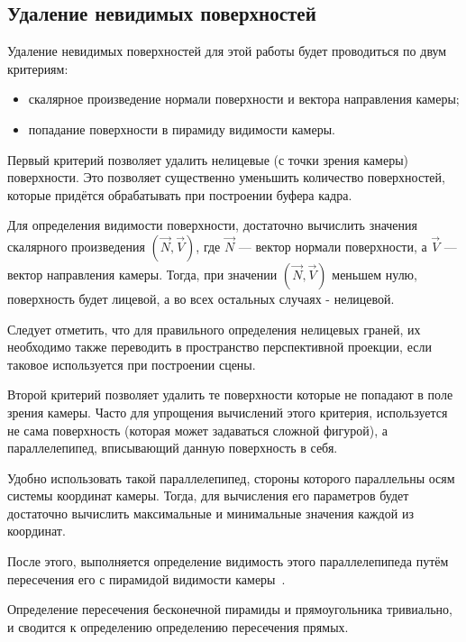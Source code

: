 \subsection{Удаление невидимых поверхностей}

Удаление невидимых поверхностей для этой работы будет проводиться по двум критериям:

\begin{itemize}
    \item скалярное произведение нормали поверхности и вектора направления камеры;
    \item попадание поверхности в пирамиду видимости камеры.
\end{itemize}

Первый критерий позволяет удалить нелицевые (с точки зрения камеры) поверхности. Это позволяет существенно уменьшить количество поверхностей, которые придётся обрабатывать при построении буфера кадра.

Для определения видимости поверхности, достаточно вычислить значения скалярного произведения $(\vec{N}, \vec{V})$, где $\vec{N}$ --- вектор нормали поверхности, а $\vec{V}$ --- вектор направления камеры. Тогда, при значении $(\vec{N}, \vec{V})$ меньшем нулю, поверхность будет лицевой, а во всех остальных случаях - нелицевой.

Следует отметить, что для правильного определения нелицевых граней, их необходимо также переводить в пространство перспективной проекции, если таковое используется при построении сцены.

Второй критерий позволяет удалить те поверхности которые не попадают в поле зрения камеры. Часто для упрощения вычислений этого критерия, используется не сама поверхность (которая может задаваться сложной фигурой), а параллелепипед, вписывающий данную поверхность в себя.

Удобно использовать такой параллелепипед, стороны которого параллельны осям системы координат камеры. Тогда, для вычисления его параметров будет достаточно вычислить максимальные и минимальные значения каждой из координат.

После этого, выполняется определение видимость этого параллелепипеда путём пересечения его с пирамидой видимости камеры~\cite{Rogers}.

Определение пересечения бесконечной пирамиды и прямоугольника тривиально, и сводится к определению определению пересечения прямых.  